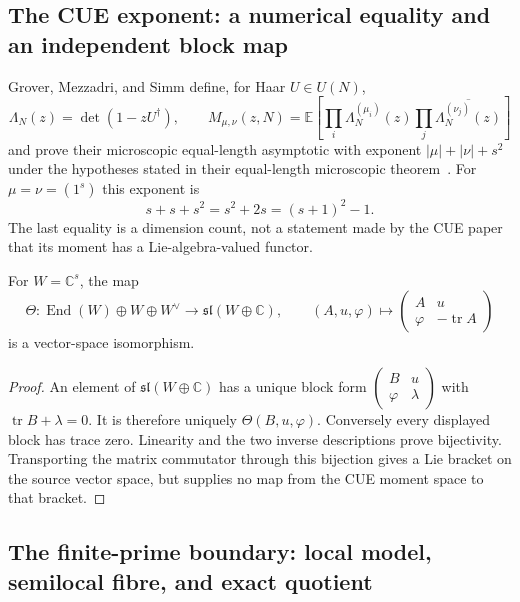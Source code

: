 \subsection{The CUE exponent: a numerical equality and an independent block map}

Grover, Mezzadri, and Simm define, for Haar $U\in U(N)$,
\[
 \Lambda_N(z)=\det(1-zU^\dagger),\qquad
 M_{\mu,\nu}(z,N)=\mathbb E\!\left[
 \prod_i\Lambda_N^{(\mu_i)}(z)
 \prod_j\overline{\Lambda_N^{(\nu_j)}(z)}\right]
\]
and prove their microscopic equal-length asymptotic with exponent
$|\mu|+|\nu|+s^2$ under the hypotheses stated in their equal-length
microscopic theorem~\cite{groverMezzadriSimm2026}.  For $\mu=\nu=(1^s)$ this exponent is
\[
 s+s+s^2=s^2+2s=(s+1)^2-1.
\]
The last equality is a dimension count, not a statement made by the CUE
paper that its moment has a Lie-algebra-valued functor.

\begin{proposition}
\label{prop:primitive-cue-block}
For $W=\mathbb C^s$, the map
\[
 \Theta:\operatorname{End}(W)\oplus W\oplus W^\vee
       \longrightarrow \mathfrak{sl}(W\oplus\mathbb C),\qquad
 (A,u,\varphi)\longmapsto
 \begin{pmatrix}A&u\\\varphi&-\operatorname{tr}A\end{pmatrix}
\]
is a vector-space isomorphism.
\end{proposition}

\begin{proof}
An element of $\mathfrak{sl}(W\oplus\mathbb C)$ has a unique block form
$\left(\begin{smallmatrix}B&u\\\varphi&\lambda\end{smallmatrix}\right)$ with
$\operatorname{tr}B+\lambda=0$.  It is therefore uniquely
$\Theta(B,u,\varphi)$.  Conversely every displayed block has trace zero.
Linearity and the two inverse descriptions prove bijectivity.  Transporting
the matrix commutator through this bijection gives a Lie bracket on the source
vector space, but supplies no map from the CUE moment space to that bracket.
\end{proof}

\subsection{The finite-prime boundary: local model, semilocal fibre, and exact
quotient}

